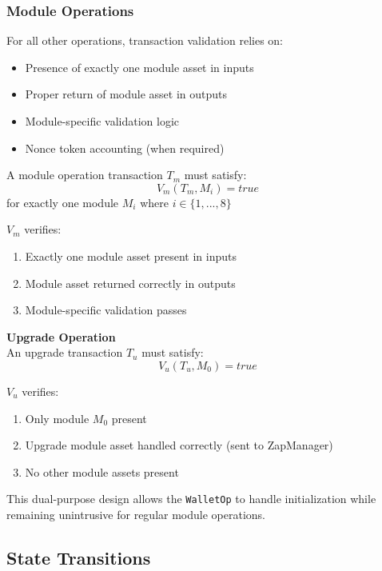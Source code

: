 \subsubsection{Module Operations}
For all other operations, transaction validation relies on:
\begin{itemize}
    \item Presence of exactly one module asset in inputs
    \item Proper return of module asset in outputs
    \item Module-specific validation logic
    \item Nonce token accounting (when required)
\end{itemize}

A module operation transaction $T_m$ must satisfy:
\[ V_m(T_m, M_i) = true \]
for exactly one module $M_i$ where $i \in \{1,...,8\}$

$V_m$ verifies:
\begin{enumerate}
    \item Exactly one module asset present in inputs
    \item Module asset returned correctly in outputs
    \item Module-specific validation passes
\end{enumerate}



\textbf{Upgrade Operation}\\
An upgrade transaction $T_u$ must satisfy:
\[ V_u(T_u, M_0) = true \]

$V_u$ verifies:
\begin{enumerate}
    \item Only module $M_0$ present
    \item Upgrade module asset handled correctly (sent to ZapManager)
    \item No other module assets present
\end{enumerate}



This dual-purpose design allows the \texttt{WalletOp} to handle initialization while remaining unintrusive for regular module operations.\\





\subsection{State Transitions}

